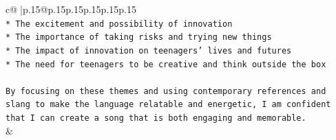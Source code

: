 \documentclass{article}
\begin{document}
{\begin{supertabular}{c@{$\;$}|p{.15\linewidth}@{}p{.15\linewidth}p{.15\linewidth}p{.15\linewidth}p{.15\linewidth}p{.15\linewidth}}
{{{\\ 
\texttt{* The excitement and possibility of innovation} \\
\texttt{* The importance of taking risks and trying new things} \\
\texttt{* The impact of innovation on teenagers' lives and futures} \\
\texttt{* The need for teenagers to be creative and think outside the box} \\
\\ 
\texttt{By focusing on these themes and using contemporary references and slang to make the language relatable and energetic, I am confident that I can create a song that is both engaging and memorable.} \\
            }
        }
    }
    & \\ \\

\end{supertabular}
}
\end{document}
